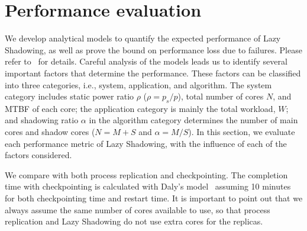\section{Performance evaluation}
We develop analytical models to quantify
the expected performance of Lazy Shadowing, as well as
prove the bound on performance loss due to failures.
 Please refer to~\cite{cui_2016_scalcom} for details. 
Careful analysis of the models leads us to identify several important factors that determine the performance. These factors can be classified into three categories, i.e., system, application, and algorithm. The system category includes static power ratio $\rho$ ($\rho=p_s/p$), total number of cores $N$, and MTBF of each core; the application category is mainly the total workload, $W$; and shadowing ratio $\alpha$ in the algorithm category determines the number of main cores and shadow cores ($N=M+S$ and $\alpha=M/S$). In this section, we evaluate each performance metric of Lazy Shadowing, 
 with the influence of each of the factors considered.

We compare with both process replication and checkpointing. %
The completion time with checkpointing is calculated with Daly's model~\cite{daly_fgcs_2006} assuming 10 minutes for both checkpointing time and restart time. %
It is important to point out that we always assume the same number of cores available to use, so that process replication and Lazy Shadowing do not use extra cores for the replicas. 


